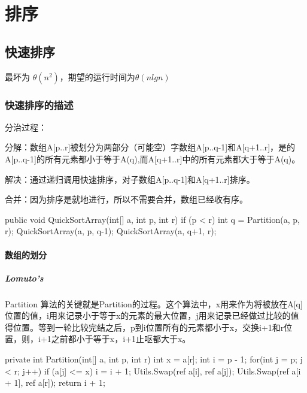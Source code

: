 \chapter{排序}

\section{快速排序}
最坏为 $\theta(n^2)$，期望的运行时间为$\theta(nlg n)$

\subsection{快速排序的描述}
分治过程：

分解：数组A[p..r]被划分为两部分（可能空）字数组A[p..q-1]和A[q+1..r]，是的A[p..q-1]的所有元素都小于等于A(q),而A[q+1..r]中的所有元素都大于等于A(q)。

解决：通过递归调用快速排序，对子数组A[p..q-1]和A[q+1..r]排序。

合并：因为排序是就地进行，所以不需要合并，数组已经收有序。

\begin{CSharp}
        public void QuickSortArray(int[] a, int p, int r)
        {
            if (p < r){
                int q = Partition(a, p, r);
                QuickSortArray(a, p, q-1);
                QuickSortArray(a, q+1, r);
            }
        }
\end{CSharp}

\subsubsection{数组的划分}

\paragraph{Lomuto's} Partition
算法的关键就是Partition的过程。这个算法中，x用来作为将被放在A[q]位置的值，i用来记录小于等于x的元素的最大位置，j用来记录已经做过比较的值得位置。等到一轮比较完结之后，p到i位置所有的元素都小于x，交换i+1和r位置，则，i+1之前都小于等于x，i+1止呕都大于x。
\begin{CSharp}
        private int Partition(int[] a, int p, int r)
        {
            int x = a[r];
            int i = p - 1;
            for(int j = p; j < r; j++)
            {
                if (a[j] <= x)
                {
                    i = i + 1;
                    Utils.Swap(ref a[i], ref a[j]);
                }
            }
            Utils.Swap(ref a[i + 1], ref a[r]);
            return i + 1;
        }
\end{CSharp}

